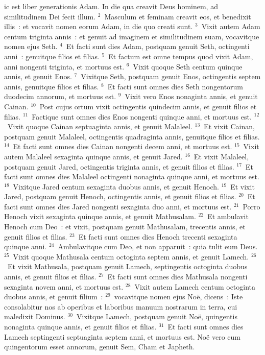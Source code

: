 \bchapter
{}ic est liber generationis Adam. In die qua creavit Deus hominem, ad similitudinem Dei fecit illum.
${}^{2}$~Masculum et feminam creavit eos, et benedixit illis~: et vocavit nomen eorum Adam, in die quo creati sunt.
${}^{3}$~Vixit autem Adam centum triginta annis~: et genuit ad imaginem et similitudinem suam, vocavitque nomen ejus Seth.
${}^{4}$~Et facti sunt dies Adam, postquam genuit Seth, octingenti anni~: genuitque filios et filias.
${}^{5}$~Et factum est omne tempus quod vixit Adam, anni nongenti triginta, et mortuus est.
${}^{6}$~Vixit quoque Seth centum quinque annis, et genuit Enos.
${}^{7}$~Vixitque Seth, postquam genuit Enos, octingentis septem annis, genuitque filios et filias.
${}^{8}$~Et facti sunt omnes dies Seth nongentorum duodecim annorum, et mortuus est.
${}^{9}$~Vixit vero Enos nonaginta annis, et genuit Cainan.
${}^{10}$~Post cujus ortum vixit octingentis quindecim annis, et genuit filios et filias.
${}^{11}$~Factique sunt omnes dies Enos nongenti quinque anni, et mortuus est.
${}^{12}$~Vixit quoque Cainan septuaginta annis, et genuit Malaleel.
${}^{13}$~Et vixit Cainan, postquam genuit Malaleel, octingentis quadraginta annis, genuitque filios et filias.
${}^{14}$~Et facti sunt omnes dies Cainan nongenti decem anni, et mortuus est.
${}^{15}$~Vixit autem Malaleel sexaginta quinque annis, et genuit Jared.
${}^{16}$~Et vixit Malaleel, postquam genuit Jared, octingentis triginta annis, et genuit filios et filias.
${}^{17}$~Et facti sunt omnes dies Malaleel octingenti nonaginta quinque anni, et mortuus est.
${}^{18}$~Vixitque Jared centum sexaginta duobus annis, et genuit Henoch.
${}^{19}$~Et vixit Jared, postquam genuit Henoch, octingentis annis, et genuit filios et filias.
${}^{20}$~Et facti sunt omnes dies Jared nongenti sexaginta duo anni, et mortuus est.
${}^{21}$~Porro Henoch vixit sexaginta quinque annis, et genuit Mathusalam.
${}^{22}$~Et ambulavit Henoch cum Deo~: et vixit, postquam genuit Mathusalam, trecentis annis, et genuit filios et filias.
${}^{23}$~Et facti sunt omnes dies Henoch trecenti sexaginta quinque anni.
${}^{24}$~Ambulavitque cum Deo, et non apparuit~: quia tulit eum Deus.
${}^{25}$~Vixit quoque Mathusala centum octoginta septem annis, et genuit Lamech.
${}^{26}$~Et vixit Mathusala, postquam genuit Lamech, septingentis octoginta duobus annis, et genuit filios et filias.
${}^{27}$~Et facti sunt omnes dies Mathusala nongenti sexaginta novem anni, et mortuus est.
${}^{28}$~Vixit autem Lamech centum octoginta duobus annis, et genuit filium~:
${}^{29}$~vocavitque nomen ejus No\"e, dicens~: Iste consolabitur nos ab operibus et laboribus manuum nostrarum in terra, cui maledixit Dominus.
${}^{30}$~Vixitque Lamech, postquam genuit No\"e, quingentis nonaginta quinque annis, et genuit filios et filias.
${}^{31}$~Et facti sunt omnes dies Lamech septingenti septuaginta septem anni, et mortuus est. No\"e vero cum quingentorum esset annorum, genuit Sem, Cham et Japheth.

